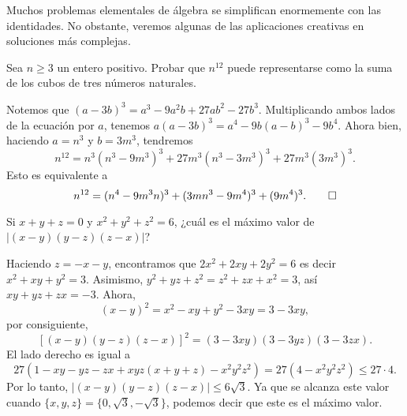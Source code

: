 Muchos problemas elementales de álgebra se simplifican enormemente con las identidades.
No obstante, veremos algunas de las aplicaciones creativas en soluciones más complejas.

\begin{example}
    Sea $n \geq 3$ un entero positivo.
    Probar que $n^{12}$ puede representarse como la suma de los cubos de tres números naturales.
\end{example}
\begin{solution}
    Notemos que $(a - 3b)^3 = a^3 - 9a^2 b + 27ab^2 - 27b^3.$
    Multiplicando ambos lados de la ecuación por $a$, tenemos $a(a - 3b)^3 = a^4 - 9b(a - b)^3 - 9b^4.$
    Ahora bien, haciendo $a = n^3$ y $b = 3m^3$, tendremos
    \[
        n^{12} = n^3 (n^3 - 9m^3)^3 + 27m^3(n^3 - 3m^3)^3 + 27m^3(3m^3)^3.
    \]
    Esto es equivalente a
    \[
        n^{12} = (n^4 - 9m^3 n)^3 + (3mn^3 - 9m^4)^3 + (9m^4)^3. \qedhere
    \]
\end{solution}

\begin{example}
    Si $x + y + z = 0$ y $x^2 + y^2 + z^2 = 6$, ¿cuál es el máximo valor de $|(x - y)(y - z)(z - x)|$?
\end{example}
\begin{solution}
    Haciendo $z = -x - y$, encontramos que $2x^2 + 2xy + 2y^2 = 6$ es decir $x^2 + xy + y^2 = 3$.
    Asimismo, $y^2 + yz + z^2 = z^2 + zx + x^2 = 3$, así $xy + yz + zx = -3$.
    Ahora,
    \[
        (x - y)^2 = x^2 - xy + y^2 - 3xy = 3 - 3xy,
    \]
    por consiguiente,
    \[
        [(x - y)(y - z)(z - x)]^2 = (3 - 3xy)(3 - 3yz)(3 - 3zx).
    \]
    El lado derecho es igual a
    \[
        27\left(1 - xy - yz - zx + xyz(x + y + z) - x^2 y^2 z^2\right) = 27 (4 - x^2 y^2 z^2) \leq 27 \cdot 4.
    \]
    Por lo tanto, $|(x - y)(y - z)(z - x)| \leq 6 \sqrt {3}$.
    Ya que se alcanza este valor cuando $\{x, y, z\} = \{0, \sqrt {3}, -\sqrt {3}\}$, podemos decir que este es el máximo valor.
\end{solution}

